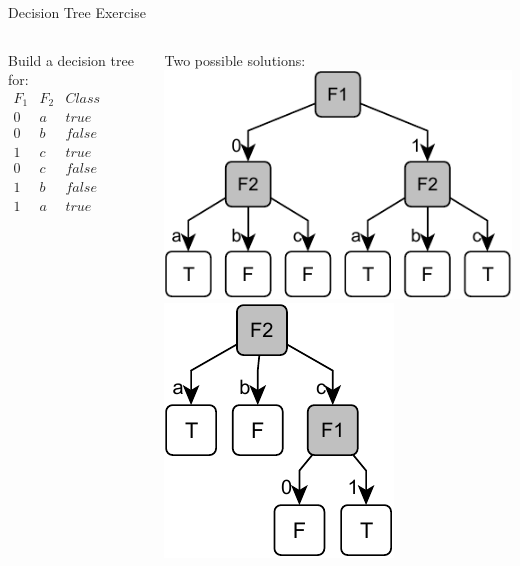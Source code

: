\documentclass[14pt]{beamer}
\begin{document}
\begin{frame}[label=decision-tree-exercise]{Decision Tree Exercise}
\begin{columns}
\begin{column}{1.8in}
Build a decision tree for: \\
\bigskip
$
\begin{array}{ll|l}
F_1 & F_2 & \textit{Class} \\
\hline
0   & a   & \textit{true} \\
0   & b   & \textit{false} \\
1   & c   & \textit{true} \\
0   & c   & \textit{false} \\
1   & b   & \textit{false} \\
1   & a   & \textit{true} \\
\end{array}
$
\end{column}
\pause
\begin{column}{1.8in}
Two possible solutions: \\
\centering
\bigskip
\includegraphics[scale=.6]{exercise-1} \\
\bigskip
\includegraphics[scale=.6]{exercise-2}
\end{column}
\end{columns}
\end{frame}
\end{document}
